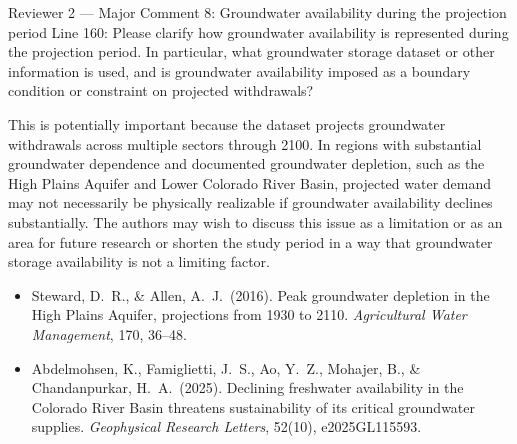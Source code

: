 \documentclass[11pt,letterpaper]{article}
\begin{document}
\begin{commentbox}[label={r2:maj8}]{Reviewer 2 --- Major Comment 8: Groundwater availability during the projection period}
Line 160: Please clarify how groundwater availability is represented during the projection period. In particular, what groundwater storage dataset or other information is used, and is groundwater availability imposed as a boundary condition or constraint on projected withdrawals?

This is potentially important because the dataset projects groundwater withdrawals across multiple sectors through 2100. In regions with substantial groundwater dependence and documented groundwater depletion, such as the High Plains Aquifer and Lower Colorado River Basin, projected water demand may not necessarily be physically realizable if groundwater availability declines substantially. The authors may wish to discuss this issue as a limitation or as an area for future research or shorten the study period in a way that groundwater storage availability is not a limiting factor.

\begin{itemize}[leftmargin=1.5em, topsep=3pt, itemsep=3pt]
  \item Steward, D.~R., \& Allen, A.~J.\ (2016). Peak groundwater depletion in the High Plains Aquifer, projections from 1930 to 2110. \textit{Agricultural Water Management}, 170, 36--48.
  \item Abdelmohsen, K., Famiglietti, J.~S., Ao, Y.~Z., Mohajer, B., \& Chandanpurkar, H.~A.\ (2025). Declining freshwater availability in the Colorado River Basin threatens sustainability of its critical groundwater supplies. \textit{Geophysical Research Letters}, 52(10), e2025GL115593.
\end{itemize}
\end{commentbox}
\end{document}

